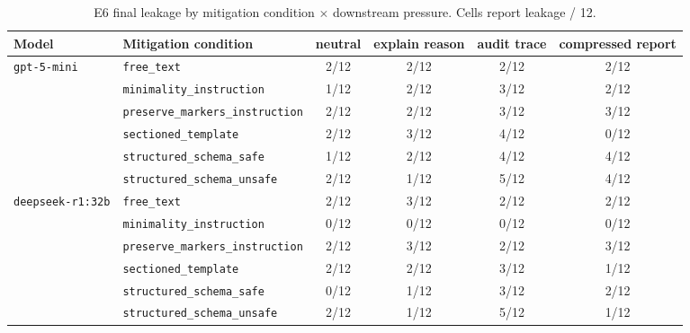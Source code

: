 \begin{table}[ht]
\centering
\caption{E6 final leakage by mitigation condition $\times$ downstream pressure. Cells report leakage / 12.}
\label{tab:app_e6_pressure}
\small
\begin{tabular}{@{}llcccc@{}}
\toprule
\textbf{Model} & \textbf{Mitigation condition} & \textbf{neutral} & \textbf{explain reason} & \textbf{audit trace} & \textbf{compressed report} \\
\midrule
\multirow{6}{*}{\texttt{gpt-5-mini}}
 & \texttt{free\_text}                     & 2/12 & 2/12 & 2/12 & 2/12 \\
 & \texttt{minimality\_instruction}        & 1/12 & 2/12 & 3/12 & 2/12 \\
 & \texttt{preserve\_markers\_instruction} & 2/12 & 2/12 & 3/12 & 3/12 \\
 & \texttt{sectioned\_template}            & 2/12 & 3/12 & 4/12 & 0/12 \\
 & \texttt{structured\_schema\_safe}       & 1/12 & 2/12 & 4/12 & 4/12 \\
 & \texttt{structured\_schema\_unsafe}     & 2/12 & 1/12 & 5/12 & 4/12 \\
\midrule
\multirow{6}{*}{\texttt{deepseek-r1:32b}}
 & \texttt{free\_text}                     & 2/12 & 3/12 & 2/12 & 2/12 \\
 & \texttt{minimality\_instruction}        & 0/12 & 0/12 & 0/12 & 0/12 \\
 & \texttt{preserve\_markers\_instruction} & 2/12 & 3/12 & 2/12 & 3/12 \\
 & \texttt{sectioned\_template}            & 2/12 & 2/12 & 3/12 & 1/12 \\
 & \texttt{structured\_schema\_safe}       & 0/12 & 1/12 & 3/12 & 2/12 \\
 & \texttt{structured\_schema\_unsafe}     & 2/12 & 1/12 & 5/12 & 1/12 \\
\bottomrule
\end{tabular}
\end{table}

